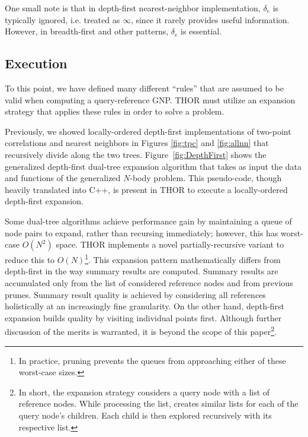 \documentclass[twoside,leqno,twocolumn]{article}
\newcommand{\summary}{\delta}
\newcommand{\fig}[1]{Figure~\ref{fig:#1}}
\newcommand{\lettermu}{e}
\newcommand{\deltamu}{\summary_{\lettermu}}
\begin{document}
\noindent One small note is that in depth-first nearest-neighbor implementation, $\deltamu$ is typically ignored, i.e. treated as $\infty$, since it rarely provides useful information.
However, in breadth-first and other patterns, $\deltamu$ is essential.

\subsection{Execution}

To this point, we have defined many different ``rules'' that are assumed to be valid when computing a query-reference GNP.
THOR must utilize an expansion strategy that applies these rules in order to solve a problem.

Previously, we showed locally-ordered depth-first implementations of two-point correlations and nearest neighbors in Figures \ref{fig:tpc} and \ref{fig:allnn} that recursively divide along the two trees.
\fig{DepthFirst} shows the generalized depth-first dual-tree expansion algorithm that takes as input the data and functions of the generalized $N$-body problem.
This pseudo-code, though heavily translated into C++, is present in THOR to execute a locally-ordered depth-first expansion.

Some dual-tree algorithms achieve performance gain by maintaining a queue of node pairs to expand, rather than recursing immediately; however, this has worst-case $O(N^2)$ space.
THOR implements a novel partially-recursive variant to reduce this to $O(N)$\footnote{
  In practice, pruning prevents the queues from approaching either of these worst-case sizes.}.
This expansion pattern mathematically differs from depth-first in the way summary results are computed.
Summary results are accumulated only from the list of considered reference nodes and from previous prunes.
Summary result quality is achieved by considering all references holistically at an increasingly fine granularity.
On the other hand, depth-first expansion builds quality by visiting individual points first.
Although further discussion of the merits is warranted, it is beyond the scope of this paper\footnote{
  In short, the expansion strategy considers a query node with a list of reference nodes.
  While processing the list, creates similar lists for each of the query node's children.
  Each child is then explored recursively with its respective list.}.
\end{document}
